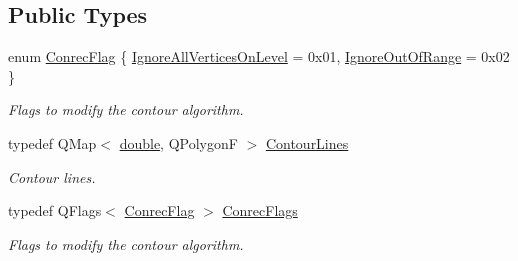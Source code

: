 \subsection*{Public Types}
\begin{DoxyCompactItemize}
\item 
enum \hyperlink{class_qwt_raster_data_ac0053b66315fde6f0a9a69c40d7c5dcc}{Conrec\-Flag} \{ \hyperlink{class_qwt_raster_data_ac0053b66315fde6f0a9a69c40d7c5dccafd2f6337e825201a247408f033713c92}{Ignore\-All\-Vertices\-On\-Level} = 0x01, 
\hyperlink{class_qwt_raster_data_ac0053b66315fde6f0a9a69c40d7c5dcca18e8d1de171dd43cc957c279eb03d32c}{Ignore\-Out\-Of\-Range} = 0x02
 \}
\begin{DoxyCompactList}\small\item\em Flags to modify the contour algorithm. \end{DoxyCompactList}\item 
typedef Q\-Map$<$ \hyperlink{_super_l_u_support_8h_a8956b2b9f49bf918deed98379d159ca7}{double}, Q\-Polygon\-F $>$ \hyperlink{class_qwt_raster_data_adc6679160a229992f0870a2b784985f3}{Contour\-Lines}
\begin{DoxyCompactList}\small\item\em Contour lines. \end{DoxyCompactList}\item 
typedef Q\-Flags$<$ \hyperlink{class_qwt_raster_data_ac0053b66315fde6f0a9a69c40d7c5dcc}{Conrec\-Flag} $>$ \hyperlink{class_qwt_raster_data_a8101f4a0c71813d49fcdc73a457c4874}{Conrec\-Flags}
\begin{DoxyCompactList}\small\item\em Flags to modify the contour algorithm. \end{DoxyCompactList}\end{DoxyCompactItemize}
